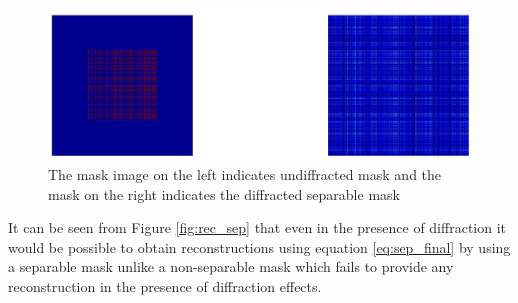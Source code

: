 \begin{figure}[ht]
\includegraphics[width=\linewidth]{pics/diffracted_mask}
\caption{The mask image on the left indicates undiffracted mask and the mask on the right indicates the diffracted separable mask}
\label{fig:diff_separable}
\end{figure}

It can be seen from Figure \ref{fig:rec_sep} that even in the presence of diffraction it would be possible to obtain reconstructions using equation \ref{eq:sep_final} by using a separable mask unlike a non-separable mask which fails to provide any reconstruction in the presence of diffraction effects. 
